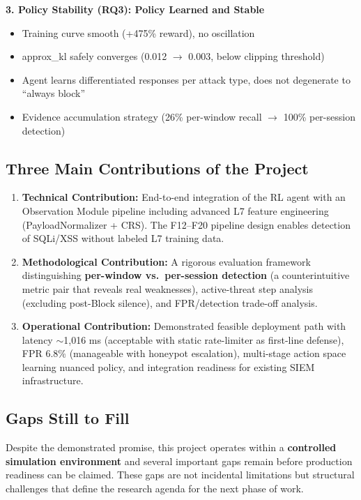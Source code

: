 \documentclass[12pt,a4paper]{report}
\begin{document}
\textbf{3. Policy Stability (RQ3): Policy Learned and Stable}
\begin{itemize}
  \item Training curve smooth (+475\% reward), no oscillation
  \item approx\_kl safely converges (0.012 $\to$ 0.003, below clipping threshold)
  \item Agent learns differentiated responses per attack type, does not degenerate to ``always block''
  \item Evidence accumulation strategy (26\% per-window recall $\to$ 100\% per-session detection)
\end{itemize}

\subsection{Three Main Contributions of the Project}

\begin{enumerate}
  \item \textbf{Technical Contribution:} End-to-end integration of the RL agent with an Observation Module pipeline including advanced L7 feature engineering (PayloadNormalizer + CRS). The F12--F20 pipeline design enables detection of SQLi/XSS without labeled L7 training data.
  \item \textbf{Methodological Contribution:} A rigorous evaluation framework distinguishing \textbf{per-window vs.\ per-session detection} (a counterintuitive metric pair that reveals real weaknesses), active-threat step analysis (excluding post-Block silence), and FPR/detection trade-off analysis.
  \item \textbf{Operational Contribution:} Demonstrated feasible deployment path with latency $\sim$1,016 ms (acceptable with static rate-limiter as first-line defense), FPR 6.8\% (manageable with honeypot escalation), multi-stage action space learning nuanced policy, and integration readiness for existing SIEM infrastructure.
\end{enumerate}

\subsection{Gaps Still to Fill}

Despite the demonstrated promise, this project operates within a \textbf{controlled simulation environment} and several important gaps remain before production readiness can be claimed. These gaps are not incidental limitations but structural challenges that define the research agenda for the next phase of work.
\end{document}
